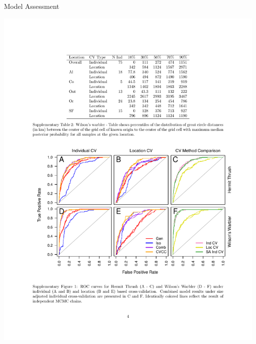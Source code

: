 \documentclass[11pt,ignorenonframetext,]{beamer}
\begin{document}
\begin{frame}{Model Assessment}
\protect\hypertarget{model-assessment}{}

\begin{center}
\includegraphics[width=\textwidth]{figs/ROCs.pdf}
\end{center}

\end{frame}
\end{document}
